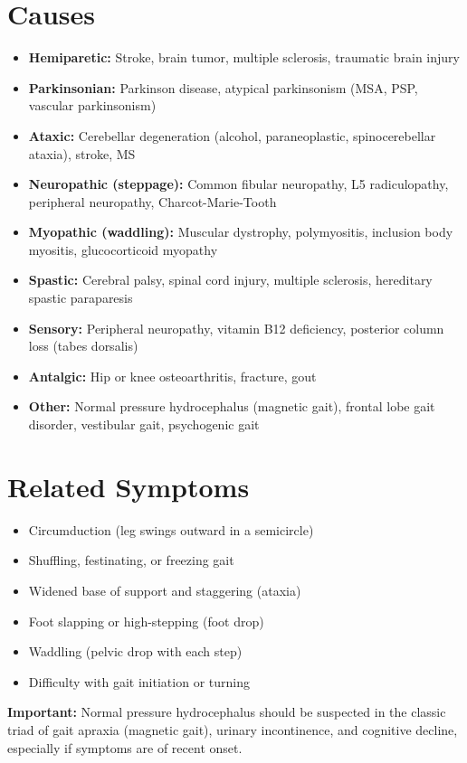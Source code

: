 \section*{Causes}
\begin{itemize}
  \item \textbf{Hemiparetic:} Stroke, brain tumor, multiple sclerosis, traumatic brain injury
  \item \textbf{Parkinsonian:} Parkinson disease, atypical parkinsonism (MSA, PSP, vascular parkinsonism)
  \item \textbf{Ataxic:} Cerebellar degeneration (alcohol, paraneoplastic, spinocerebellar ataxia), stroke, MS
  \item \textbf{Neuropathic (steppage):} Common fibular neuropathy, L5 radiculopathy, peripheral neuropathy, Charcot-Marie-Tooth
  \item \textbf{Myopathic (waddling):} Muscular dystrophy, polymyositis, inclusion body myositis, glucocorticoid myopathy
  \item \textbf{Spastic:} Cerebral palsy, spinal cord injury, multiple sclerosis, hereditary spastic paraparesis
  \item \textbf{Sensory:} Peripheral neuropathy, vitamin B12 deficiency, posterior column loss (tabes dorsalis)
  \item \textbf{Antalgic:} Hip or knee osteoarthritis, fracture, gout
  \item \textbf{Other:} Normal pressure hydrocephalus (magnetic gait), frontal lobe gait disorder, vestibular gait, psychogenic gait
\end{itemize}

\section*{Related Symptoms}
\begin{itemize}
  \item Circumduction (leg swings outward in a semicircle)
  \item Shuffling, festinating, or freezing gait
  \item Widened base of support and staggering (ataxia)
  \item Foot slapping or high-stepping (foot drop)
  \item Waddling (pelvic drop with each step)
  \item Difficulty with gait initiation or turning
\end{itemize}
\textbf{Important:} Normal pressure hydrocephalus should be suspected in the classic triad of gait apraxia (magnetic gait), urinary incontinence, and cognitive decline, especially if symptoms are of recent onset.


